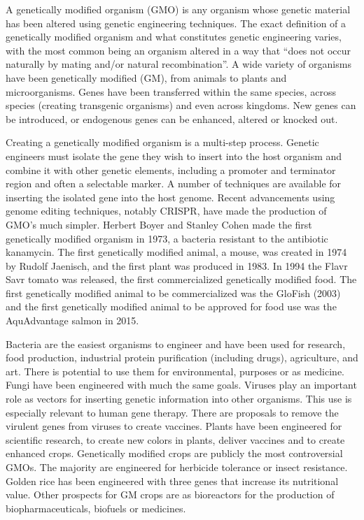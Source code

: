 A genetically modified organism (GMO) is any organism whose genetic material has been altered using genetic engineering techniques. The exact definition of a genetically modified organism and what constitutes genetic engineering varies, with the most common being an organism altered in a way that ``does not occur naturally by mating and/or natural recombination''. A wide variety of organisms have been genetically modified (GM), from animals to plants and microorganisms. Genes have been transferred within the same species, across species (creating transgenic organisms) and even across kingdoms. New genes can be introduced, or endogenous genes can be enhanced, altered or knocked out.

Creating a genetically modified organism is a multi-step process. Genetic engineers must isolate the gene they wish to insert into the host organism and combine it with other genetic elements, including a promoter and terminator region and often a selectable marker. A number of techniques are available for inserting the isolated gene into the host genome. Recent advancements using genome editing techniques, notably CRISPR, have made the production of GMO's much simpler. Herbert Boyer and Stanley Cohen made the first genetically modified organism in 1973, a bacteria resistant to the antibiotic kanamycin. The first genetically modified animal, a mouse, was created in 1974 by Rudolf Jaenisch, and the first plant was produced in 1983. In 1994 the Flavr Savr tomato was released, the first commercialized genetically modified food. The first genetically modified animal to be commercialized was the GloFish (2003) and the first genetically modified animal to be approved for food use was the AquAdvantage salmon in 2015.

Bacteria are the easiest organisms to engineer and have been used for research, food production, industrial protein purification (including drugs), agriculture, and art. There is potential to use them for environmental, purposes or as medicine. Fungi have been engineered with much the same goals. Viruses play an important role as vectors for inserting genetic information into other organisms. This use is especially relevant to human gene therapy. There are proposals to remove the virulent genes from viruses to create vaccines. Plants have been engineered for scientific research, to create new colors in plants, deliver vaccines and to create enhanced crops. Genetically modified crops are publicly the most controversial GMOs. The majority are engineered for herbicide tolerance or insect resistance. Golden rice has been engineered with three genes that increase its nutritional value. Other prospects for GM crops are as bioreactors for the production of biopharmaceuticals, biofuels or medicines.

